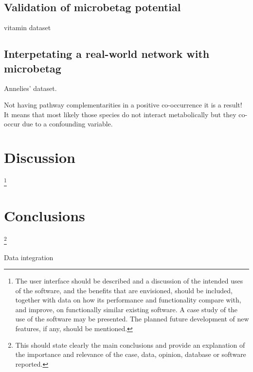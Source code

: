 \documentclass[sn-mathphys,Numbered]{sn-jnl}%
\theoremstyle{thmstyleone}%
\theoremstyle{thmstyletwo}%
\theoremstyle{thmstylethree}%
\begin{document}
    \subsection*{Validation of microbetag potential}
        \label{subsec:validation}


        vitamin dataset~\cite{hessler2023vitamin}


    \subsection*{Interpetating a real-world network with microbetag}
        \label{subsec:usecase}


        Annelies' dataset. 


        Not having pathway complementarities in a positive co-occurrence it is a result! 
        It means that most likely those species do not interact metabolically but they co-occur due to a confounding variable. 
        









\section{Discussion}
    \label{sec:discussion}
    \footnote{
        The user interface should be described and a discussion of the intended uses of the software, and the benefits that are envisioned, should be included, 
        together with data on how its performance and functionality compare with, and improve, on functionally similar existing software. 
        A case study of the use of the software may be presented. The planned future development of new features, if any, should be mentioned.
    }
    




\section{Conclusions}
    \label{sec:conclusions}
    \footnote{
        This should state clearly the main conclusions and provide an explanation of the importance and relevance of the case, data, opinion, database or software reported.
    }

    Data integration 


\backmatter
\end{document}
